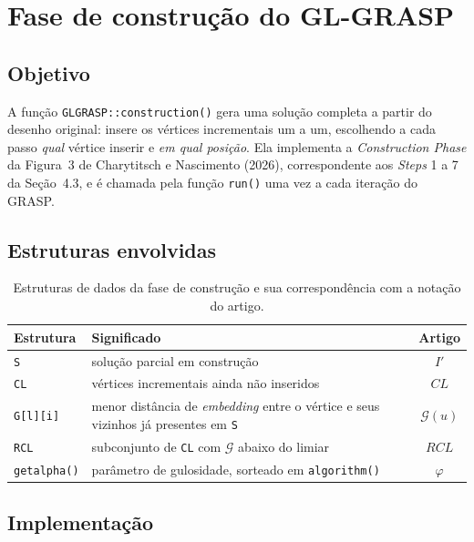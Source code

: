 \documentclass[12pt,a4paper]{article}
\begin{document}
\section{Fase de construção do GL-GRASP}
\label{sec:construction}

\subsection{Objetivo}

A função \texttt{GLGRASP::construction()} gera uma solução completa a
partir do desenho original: insere os vértices incrementais um a um,
escolhendo a cada passo \emph{qual} vértice inserir e \emph{em qual
posição}. Ela implementa a \textit{Construction Phase} da Figura~3 de
Charytitsch e Nascimento (2026), correspondente aos \textit{Steps} 1 a 7
da Seção~4.3, e é chamada pela função \texttt{run()} uma vez a cada
iteração do GRASP.

\subsection{Estruturas envolvidas}

\begin{table}[htbp]
\centering\small
\caption{Estruturas de dados da fase de construção e sua correspondência
com a notação do artigo.}
\label{tab:estruturas-construcao}
\begin{tabularx}{\textwidth}{@{}l X c@{}}
\toprule
Estrutura & Significado & Artigo \\
\midrule
\texttt{S} & solução parcial em construção & $I'$ \\
\texttt{CL} & vértices incrementais ainda não inseridos & $CL$ \\
\texttt{G[l][i]} & menor distância de \textit{embedding} entre o vértice
  e seus vizinhos já presentes em \texttt{S} & $\mathcal{G}(u)$ \\
\texttt{RCL} & subconjunto de \texttt{CL} com $\mathcal{G}$ abaixo do
  limiar & $RCL$ \\
\texttt{getalpha()} & parâmetro de gulosidade, sorteado em
  \texttt{algorithm()} & $\varphi$ \\
\bottomrule
\end{tabularx}
\end{table}

\subsection{Implementação}
\end{document}

